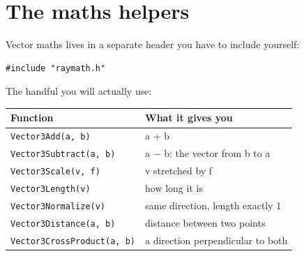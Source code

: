 \section{The maths helpers}

Vector maths lives in a separate header you have to include yourself:

\begin{lstlisting}
#include "raymath.h"
\end{lstlisting}

The handful you will actually use:

\begin{center}
\begin{tabular}{@{}ll@{}}
\toprule
\textbf{Function} & \textbf{What it gives you} \\
\midrule
\lstinline|Vector3Add(a, b)| & a + b \\
\lstinline|Vector3Subtract(a, b)| & a $-$ b: the vector from b to a \\
\lstinline|Vector3Scale(v, f)| & v stretched by f \\
\lstinline|Vector3Length(v)| & how long it is \\
\lstinline|Vector3Normalize(v)| & same direction, length exactly 1 \\
\lstinline|Vector3Distance(a, b)| & distance between two points \\
\lstinline|Vector3CrossProduct(a, b)| & a direction perpendicular to both \\
\bottomrule
\end{tabular}
\end{center}


